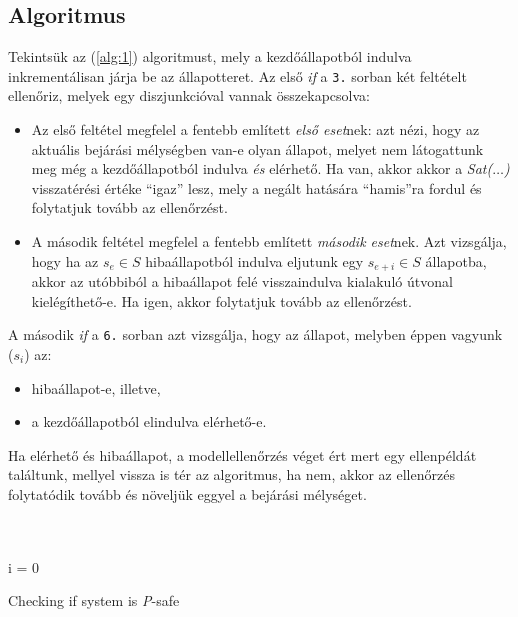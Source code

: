 \subsection{Algoritmus}

Tekintsük az (\ref{alg:1}) algoritmust, mely a kezdőállapotból indulva inkrementálisan járja be az állapotteret. Az első \emph{if} a \verb+3.+ sorban két feltételt ellenőriz, melyek egy diszjunkcióval vannak összekapcsolva:
\begin{itemize}
	\item Az első feltétel megfelel a fentebb említett \emph{első eset}nek: azt nézi, hogy az aktuális bejárási mélységben van-e olyan állapot, melyet nem látogattunk meg még a kezdőállapotból indulva \emph{és} elérhető. Ha van, akkor akkor a \emph{Sat($\ldots$)} visszatérési értéke ``igaz'' lesz, mely a negált hatására ``hamis''ra fordul és folytatjuk tovább az ellenőrzést.
	
	\item A második feltétel megfelel a fentebb említett \emph{második eset}nek. Azt vizsgálja, hogy ha az $s_e \in S$ hibaállapotból indulva eljutunk egy $s_{e+i} \in S$ állapotba, akkor az utóbbiból a hibaállapot felé visszaindulva kialakuló útvonal kielégíthető-e. Ha igen, akkor folytatjuk tovább az ellenőrzést.
\end{itemize}
A második \emph{if} a \verb+6.+ sorban azt vizsgálja, hogy az állapot, melyben éppen vagyunk ($s_i$) az:
\begin{itemize}
	\item hibaállapot-e, illetve,
	\item a kezdőállapotból elindulva elérhető-e.
\end{itemize}
Ha elérhető és hibaállapot, a modellellenőrzés véget ért mert egy ellenpéldát találtunk, mellyel vissza is tér az algoritmus, ha nem, akkor az ellenőrzés folytatódik tovább és növeljük eggyel a bejárási mélységet.
\ \\
\ \\
\ \\
\begin{algorithm}[H]
\label{alg:1}

\SetAlgoLined
i = 0 \\
\caption{Checking if system is \emph{P}-safe}
\end{algorithm}

